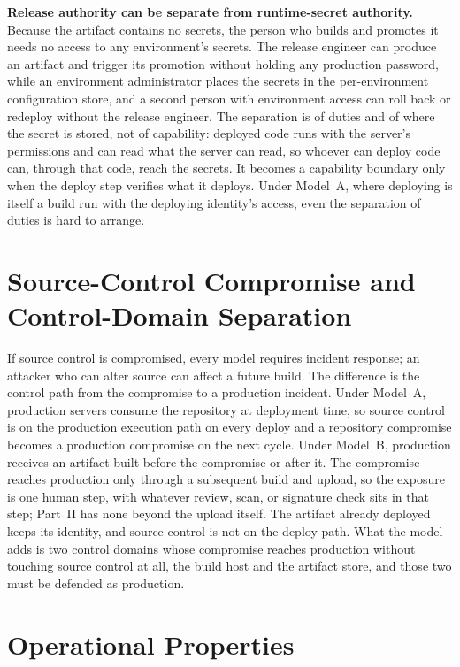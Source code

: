 \documentclass[11pt]{article}
\begin{document}
\textbf{Release authority can be separate from runtime-secret authority.} Because the artifact contains no secrets, the person who builds and promotes it needs no access to any environment's secrets. The release engineer can produce an artifact and trigger its promotion without holding any production password, while an environment administrator places the secrets in the per-environment configuration store, and a second person with environment access can roll back or redeploy without the release engineer. The separation is of duties and of where the secret is stored, not of capability: deployed code runs with the server's permissions and can read what the server can read, so whoever can deploy code can, through that code, reach the secrets. It becomes a capability boundary only when the deploy step verifies what it deploys. Under Model~A, where deploying is itself a build run with the deploying identity's access, even the separation of duties is hard to arrange.

\section{Source-Control Compromise and Control-Domain Separation}

If source control is compromised, every model requires incident response; an attacker who can alter source can affect a future build. The difference is the control path from the compromise to a production incident. Under Model~A, production servers consume the repository at deployment time, so source control is on the production execution path on every deploy and a repository compromise becomes a production compromise on the next cycle. Under Model~B, production receives an artifact built before the compromise or after it. The compromise reaches production only through a subsequent build and upload, so the exposure is one human step, with whatever review, scan, or signature check sits in that step; Part~II has none beyond the upload itself. The artifact already deployed keeps its identity, and source control is not on the deploy path. What the model adds is two control domains whose compromise reaches production without touching source control at all, the build host and the artifact store, and those two must be defended as production.

\section{Operational Properties}
\label{sec:ops}
\end{document}
